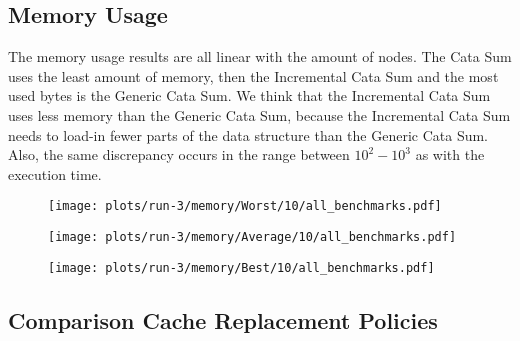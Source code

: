 \newpage
\subsection{Memory Usage}

The memory usage results are all linear with the amount of nodes. The Cata Sum uses the least amount of memory, then the Incremental Cata Sum and the most used bytes is the Generic Cata Sum. We think that the Incremental Cata Sum uses less memory than the Generic Cata Sum, because the Incremental Cata Sum needs to load-in fewer parts of the data structure than the Generic Cata Sum. Also, the same discrepancy occurs in the range between $10^2 - 10^3$ as with the execution time.

\begin{figure}[H]
  \begin{minipage}{.5\textwidth}
    \centering
    \texttt{[image: plots/run-3/memory/Worst/10/all\_benchmarks.pdf]}  
  \end{minipage}
  \begin{minipage}{.5\textwidth}
    \centering
    \texttt{[image: plots/run-3/memory/Average/10/all\_benchmarks.pdf]}  
  \end{minipage}
\end{figure}

\begin{figure}[H]
  \centering
  \begin{minipage}[c]{.5\textwidth}
    \centering
    \texttt{[image: plots/run-3/memory/Best/10/all\_benchmarks.pdf]}  
  \end{minipage}
\end{figure}

\newpage
\subsection{Comparison Cache Replacement Policies}